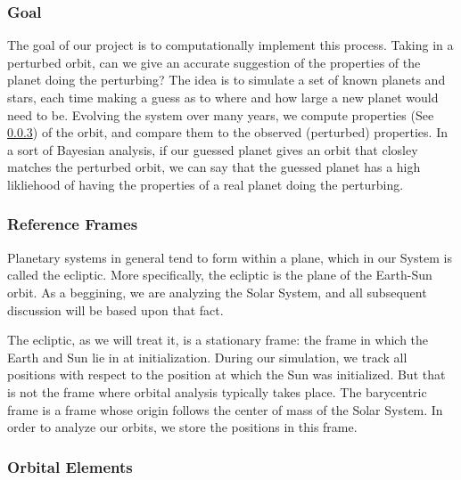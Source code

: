\documentclass[a4paper,12pt]{article} %
\numberwithin{equation}{section} %
\numberwithin{figure}{section} %
\begin{document}
\subsubsection{Goal}

The goal of our project is to computationally implement this process. Taking in a perturbed orbit, can we give an accurate suggestion of the properties of the planet doing the perturbing? The idea is to simulate a set of known planets and stars, each time making a guess as to where and how large a new planet would need to be. Evolving the system over many years, we compute properties (See \ref{sec:elements}) of the orbit, and compare them to the observed (perturbed) properties. In a sort of Bayesian analysis, if our guessed planet gives an orbit that closley matches the perturbed orbit, we can say that the guessed planet has a high likliehood of having the properties of a real planet doing the perturbing.

\subsubsection{Reference Frames}

Planetary systems in general tend to form within a plane, which in our System is called the ecliptic. More specifically, the ecliptic is the plane of the Earth-Sun orbit. As a beggining, we are analyzing the Solar System, and all subsequent discussion will be based upon that fact. \par
The ecliptic, as we will treat it, is a stationary frame: the frame in which the Earth and Sun lie in at initialization. During our simulation, we track all positions with respect to the position at which the Sun was initialized. But that is not the frame where orbital analysis typically takes place. The barycentric frame is a frame whose origin follows the center of mass of the Solar System. In order to analyze our orbits, we store the positions in this frame.

\subsubsection{Orbital Elements}
\label{sec:elements}
\end{document}
